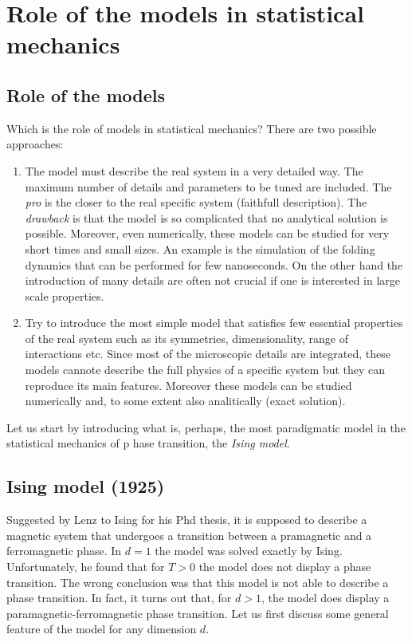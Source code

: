 \documentclass[../main/main.tex]{subfiles}
\begin{document}
\chapter{Role of the models in statistical mechanics}
\section{Role of the models}
Which is the role of models in statistical mechanics? There are two possible approaches:
\begin{enumerate}
  \item The model must describe the real system in a very detailed way. The maximum number of details and parameters to be tuned are included. The \emph{pro} is the closer to the real specific system (faithfull description). The \emph{drawback} is that the model is so complicated that no analytical solution is possible. Moreover, even numerically, these models can be studied for very short times and small sizes.
  An example is the simulation of the folding dynamics that can be performed for few nanoseconds. On the other hand the introduction of many details are often not crucial if one is interested in large scale properties.
  \item Try to introduce the most simple model that satisfies few essential properties of the real system such as its symmetries, dimensionality, range of interactions etc.
  Since most of the microscopic details are integrated, these models cannote describe the full physics of a specific system but they can reproduce its main features. Moreover these models can be studied numerically and, to some extent also analitically (exact solution).
\end{enumerate}
  Let us start by introducing what is, perhaps, the most paradigmatic model in the statistical mechanics of p hase transition, the \emph{Ising model}.

  \section{Ising model (1925)}
  Suggested by Lenz to Ising for his Phd thesis, it is supposed to describe a magnetic system that undergoes a transition between a pramagnetic and a ferromagnetic phase.
  In \( d=1 \) the model was solved exactly by Ising. Unfortunately, he found that for \( T>0 \) the model does not display a phase transition. The wrong conclusion was that this model is not able to describe a phase transition. In fact, it turns out that, for \( d>1 \), the model does display a paramagnetic-ferromagnetic phase transition.  Let us first discuss some general feature of the model for any dimension \( d \).
\end{document}
